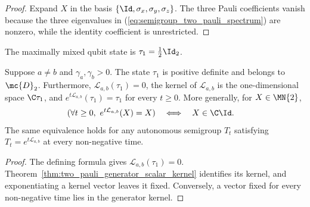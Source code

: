 \begin{proof}
    \leanok
    Expand $X$ in the basis $\{\Id,\sigma_x,\sigma_y,\sigma_z\}$. The three
    Pauli coefficients vanish because the three eigenvalues in
    (\ref{eq:semigroup_two_pauli_spectrum}) are nonzero, while the identity
    coefficient is unrestricted.
\end{proof}

\begin{definition}
    \label{def:two_pauli_maximally_mixed}
    \leanok
    The maximally mixed qubit state is $\tau_1=\frac12\Id_2$.
\end{definition}

\begin{theorem}
    \label{thm:two_pauli_maximally_mixed_fixed}
    \leanok
    Suppose $a\ne b$ and $\gamma_a,\gamma_b>0$. The state $\tau_1$ is positive
    definite and belongs to $\mc{D}_2$. Furthermore,
    $\mathcal L_{a,b}(\tau_1)=0$, the kernel of $\mathcal L_{a,b}$ is the
    one-dimensional space $\C\tau_1$, and
    $e^{t\mathcal L_{a,b}}(\tau_1)=\tau_1$ for every $t\ge0$. More generally,
    for $X\in\MN{2}$,
    \begin{align}
        (\forall t\ge0,\ e^{t\mathcal L_{a,b}}(X)=X)
        &\quad\Longleftrightarrow\quad
        X\in\C\Id.
        \notag
    \end{align}
    The same equivalence holds for any autonomous semigroup $T_t$ satisfying
    $T_t=e^{t\mathcal L_{a,b}}$ at every non-negative time.
\end{theorem}

\begin{proof}
    \leanok
    The defining formula gives $\mathcal L_{a,b}(\tau_1)=0$.
    Theorem~\ref{thm:two_pauli_generator_scalar_kernel} identifies its kernel,
    and exponentiating a kernel vector leaves it fixed. Conversely, a vector
    fixed for every non-negative time lies in the generator kernel.
\end{proof}

